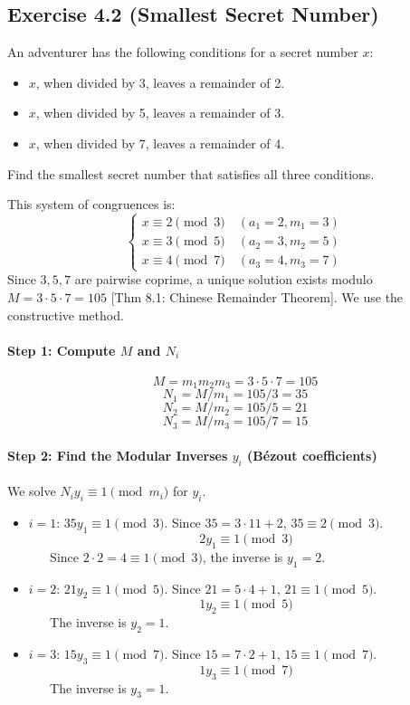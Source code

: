 \newpage

\subsection*{Exercise 4.2 (Smallest Secret Number)}
An adventurer has the following conditions for a secret number $x$:
\begin{itemize}
\item $x$, when divided by 3, leaves a remainder of 2.
\item $x$, when divided by 5, leaves a remainder of 3.
\item $x$, when divided by 7, leaves a remainder of 4.
\end{itemize}
Find the smallest secret number that satisfies all three conditions.

\begin{solution}
This system of congruences is:
$$ \begin{cases} x \equiv 2 \pmod{3} \quad (a_1=2, m_1=3) \\ x \equiv 3 \pmod{5} \quad (a_2=3, m_2=5) \\ x \equiv 4 \pmod{7} \quad (a_3=4, m_3=7) \end{cases} $$
Since $3, 5, 7$ are pairwise coprime, a unique solution exists modulo $M = 3 \cdot 5 \cdot 7 = 105$ [Thm 8.1: Chinese Remainder Theorem]. We use the constructive method.

\paragraph{Step 1: Compute $M$ and $N_i$}
$$ M = m_1 m_2 m_3 = 3 \cdot 5 \cdot 7 = 105 $$
$$ N_1 = M/m_1 = 105/3 = 35 $$
$$ N_2 = M/m_2 = 105/5 = 21 $$
$$ N_3 = M/m_3 = 105/7 = 15 $$

\paragraph{Step 2: Find the Modular Inverses $y_i$ (Bézout coefficients)}
We solve $N_i y_i \equiv 1 \pmod{m_i}$ for $y_i$.
\begin{itemize}
\item $i=1$: $35 y_1 \equiv 1 \pmod{3}$. Since $35 = 3 \cdot 11 + 2$, $35 \equiv 2 \pmod{3}$.
    $$ 2 y_1 \equiv 1 \pmod{3} $$
    Since $2 \cdot 2 = 4 \equiv 1 \pmod{3}$, the inverse is $y_1 = 2$.
    
    \item $i=2$: $21 y_2 \equiv 1 \pmod{5}$. Since $21 = 5 \cdot 4 + 1$, $21 \equiv 1 \pmod{5}$.
    $$ 1 y_2 \equiv 1 \pmod{5} $$
    The inverse is $y_2 = 1$.
    
    \item $i=3$: $15 y_3 \equiv 1 \pmod{7}$. Since $15 = 7 \cdot 2 + 1$, $15 \equiv 1 \pmod{7}$.
    $$ 1 y_3 \equiv 1 \pmod{7} $$
    The inverse is $y_3 = 1$.
\end{itemize}


\end{solution}
